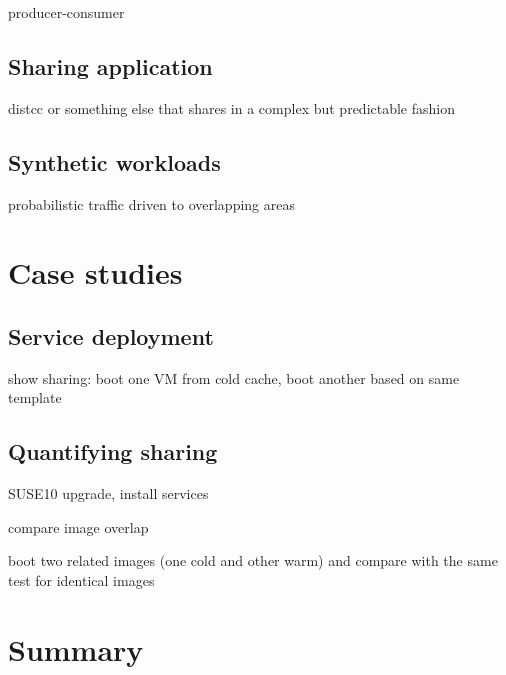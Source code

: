producer-consumer

\subsection{Sharing application}
distcc or something else that shares in a complex but predictable fashion

\subsection{Synthetic workloads}

probabilistic traffic driven to overlapping areas

\section{Case studies}

\subsection{Service deployment}
show sharing: boot one VM from cold cache, boot another based on same template

\subsection{Quantifying sharing}

SUSE10 upgrade, install services

compare image overlap

boot two related images (one cold and other warm) and compare with the same test for identical images

\section{Summary}
